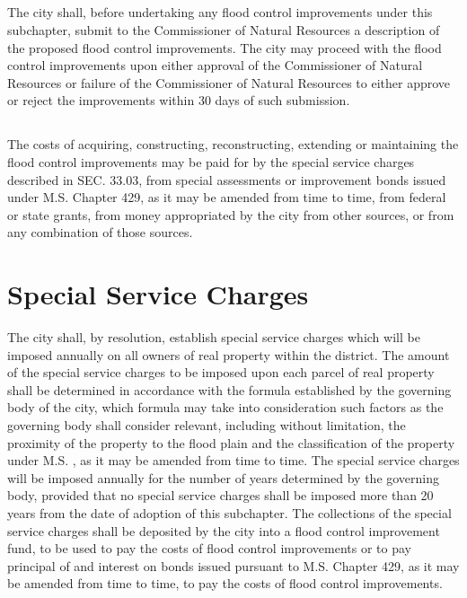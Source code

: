 \subsection{}
The city shall, before undertaking any flood control improvements under this subchapter, submit to the Commissioner of Natural Resources a description of the proposed flood control improvements.  The city may proceed with the flood control improvements upon either  approval of the Commissioner of Natural Resources or failure of the Commissioner of Natural Resources to either approve or reject the improvements within 30 days of such submission.
\subsection{}
The costs of acquiring, constructing, reconstructing, extending or maintaining the flood control improvements may be paid for by the special service charges described in SEC. 33.03, from special assessments or improvement bonds issued under M.S. Chapter 429, as it may be amended from time to time, from federal or state grants, from money appropriated by the city from other sources, or from any combination of those sources.

\section{Special Service Charges}
The city shall, by resolution, establish special service charges which will be imposed annually on all owners of real property within the district. The amount of the special service charges to be imposed upon each parcel of real property shall be determined in accordance with the formula established by the governing body of the city, which formula may take into consideration such factors as the governing body shall consider relevant, including without limitation, the proximity of the property to the flood plain and the classification of the property under M.S. , as it may be amended from time to time. The special service charges will be imposed annually for the number of years determined by the governing body, provided that no special service charges shall be imposed more than 20 years from the date of adoption of this subchapter. The collections of the special service charges shall be deposited by the city into a flood control improvement fund, to be used to pay the costs of flood control improvements or to pay principal of and interest on bonds issued pursuant to M.S. Chapter 429, as it may be amended from time to time, to pay the costs of flood control improvements.



